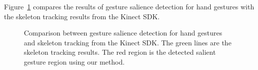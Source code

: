\documentclass{sigchi}
\begin{document}
Figure~\ref{fig:compare-skeleton} compares the results of gesture salience detection for hand gestures with the skeleton tracking results
from the Kinect SDK.
\begin{figure}
\centering
{}
\caption{Comparison between gesture salience detection for hand gestures and skeleton tracking from the Kinect SDK. The green lines are
the skeleton tracking results. The red region is the detected salient gesture region using our method.}
\label{fig:compare-skeleton}
\end{figure}
% 
% 
% 
\end{document}
